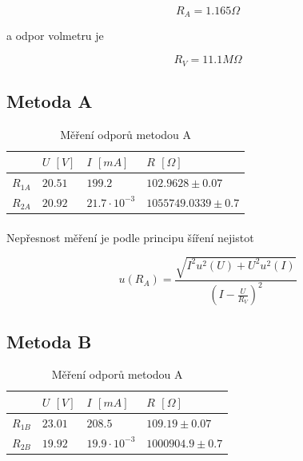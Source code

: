\documentclass[a4paper,11pt]{article}
\begin{document}
    \begin{equation}
        R_{A} = 1.165 \Omega
    \end{equation}

    a odpor volmetru je

    \begin{equation}
        R_{V} = 11.1 M\Omega
    \end{equation}

    \subsection{Metoda A}

        \begin{table}[h]
            \centering
            \begin{tabular}{ | l || l | l || l | }
                \hline
                        & $U$ $[V]$ & $I$ $[mA]$             & $R$ $[\Omega]$    \\ \hline
                $R_{1A}$ & $20.51$   & $199.2$               & $102.9628 \pm 0.07$         \\ \hline
                $R_{2A}$ & $20.92$   & $21.7 \cdot 10^{-3}$  & $1055749.0339 \pm 0.7$      \\
                \hline
            \end{tabular}
            \caption{Měření odporů metodou A}
            \label{fig:method_b}
        \end{table}

        \paragraph{} Nepřesnost měření je podle principu šíření nejistot

        \begin{equation}
            u(R_{A}) = \frac{\sqrt{I^{2} u^{2}(U) + U^{2} u^{2}(I)}}{(I - \frac{U}{R_{V}})^{2}}
        \end{equation}

        \paragraph{}

    \subsection{Metoda B}

        \begin{table}[h]
            \centering
            \begin{tabular}{ | l || l | l || l | }
                \hline
                        & $U$ $[V]$ & $I$ $[mA]$             & $R$ $[\Omega]$     \\ \hline
                $R_{1B}$ & $23.01$   & $208.5$               & $109.19 \pm 0.07$  \\ \hline
                $R_{2B}$ & $19.92$   & $19.9 \cdot 10^{-3}$  & $1000904.9 \pm 0.7$\\
                \hline
            \end{tabular}
            \caption{Měření odporů metodou A}
            \label{fig:method_b}
        \end{table}
\end{document}
